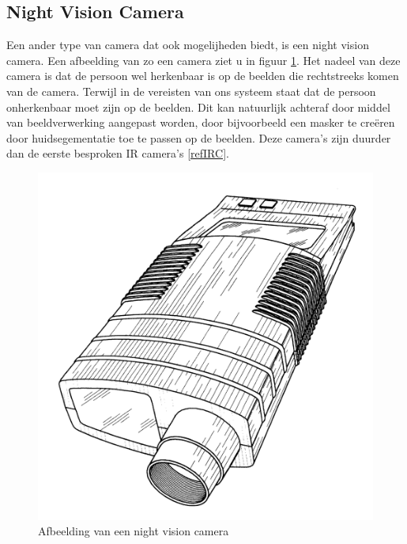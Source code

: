 \subsection{Night Vision Camera}
\label{refNVC}
Een ander type van camera dat ook mogelijheden biedt, is een night vision camera. Een afbeelding van zo een camera ziet u in figuur \ref{imgNVC}\cite{bibNVC}. Het nadeel van deze camera is dat de persoon wel herkenbaar is op de beelden die rechtstreeks komen van de camera. Terwijl in de vereisten van ons systeem staat dat de persoon onherkenbaar moet zijn op de beelden. Dit kan natuurlijk achteraf door middel van beeldverwerking aangepast worden, door bijvoorbeeld een masker te cre\"eren door huidsegementatie toe te passen op de beelden. Deze camera's zijn duurder dan de eerste besproken IR camera's \ref{refIRC}.

\begin{figure}[h]
	\includegraphics[scale=0.075]{NightVisionCamera}
	\caption{Afbeelding van een night vision camera}
	\label{imgNVC}
\end{figure}

